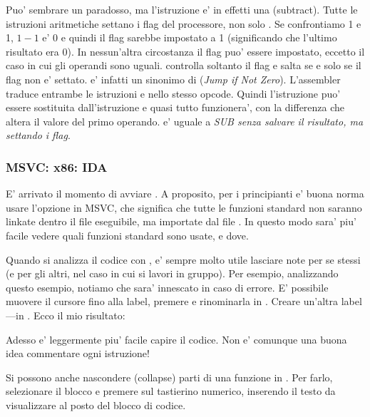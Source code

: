 \label{CMPandSUB}
Puo' sembrare un paradosso, ma l'istruzione \CMP e' in effetti una \SUB (subtract).
Tutte le istruzioni aritmetiche settano i flag del processore, non solo \CMP.
Se confrontiamo 1 e 1, $1-1$ e' 0 e quindi il flag \ZF sarebbe impostato a 1 (significando che l'ultimo risultato era 0).
In nessun'altra circostanza il flag \ZF puo' essere impostato, eccetto il caso in cui gli operandi sono uguali.
\JNE controlla soltanto il flag \ZF e salta se e solo se il flag non e' settato.  \JNE e' infatti un sinonimo di \JNZ (\emph{Jump if Not Zero}).
L'assembler traduce entrambe le istruzioni \JNE e \JNZ nello stesso opcode.
Quindi l'istruzione \CMP puo' essere sostituita dall'istruzione \SUB e quasi tutto funzionera', con la differenza che \SUB altera il valore del primo operando.
\CMP e' uguale a \emph{SUB senza salvare il risultato, ma settando i flag}.

\subsubsection{MSVC: x86: IDA}

E' arrivato il momento di avviare \IDA. A proposito, per i principianti e' buona norma usare l'opzione  in MSVC, che significa che tutte le funzioni
standard non saranno linkate dentro il file eseguibile, ma importate dal file .
In questo modo sara' piu' facile vedere quali funzioni standard sono usate, e dove.

Quando si analizza il codice con \IDA, e' sempre molto utile lasciare note per se stessi (e per gli altri, nel caso in cui si lavori in gruppo).
Per esempio, analizzando questo esempio, notiamo che 
 sara' innescato in caso di errore.
E' possibile muovere il cursore fino alla label, premere  e rinominarla in .
Creare un'altra label ---in .
Ecco il mio risultato:



Adesso e' leggermente piu' facile capire il codice.
Non e' comunque una buona idea commentare ogni istruzione!

Si possono anche nascondere (collapse) parti di una funzione in \IDA.
Per farlo, selezionare il blocco e premere \q{--} sul tastierino numerico, inserendo il testo da visualizzare al posto del blocco di codice.

